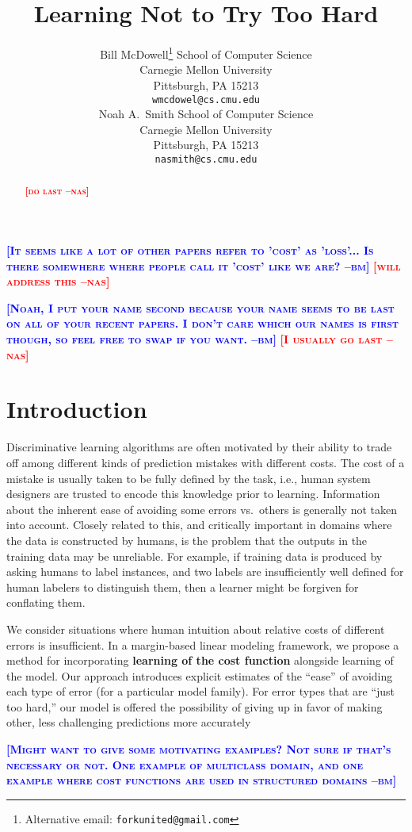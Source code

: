 \documentclass{article} %
\title{Learning Not to Try Too Hard}
\author{
Bill McDowell\thanks{Alternative email: \texttt{forkunited@gmail.com}}
School of Computer Science\\
Carnegie Mellon University\\
Pittsburgh, PA 15213 \\
\texttt{wmcdowel@cs.cmu.edu} \\
\And
Noah A.~Smith
School of Computer Science\\
Carnegie Mellon University\\
Pittsburgh, PA 15213 \\
\texttt{nasmith@cs.cmu.edu} \\
}
\newcommand{\bmcomment}[1]{\textcolor{blue}{\textsc{\textbf{[#1 --bm]}}}}
\newcommand{\nascomment}[1]{\textcolor{red}{\textsc{\textbf{[#1 --nas]}}}}
\begin{document}
\maketitle


\bmcomment{It seems like a lot of other papers refer to 'cost' as 'loss'... 
Is there somewhere where people call it 'cost' like we are?}
\nascomment{will address this}

\bmcomment{Noah, I put your name second because your name seems 
to be last on all of your recent papers.  I don't care which our names is
first though, so feel free to swap if you want.} \nascomment{I usually
go last}

\begin{abstract}
\nascomment{do last}
\end{abstract}

\section{Introduction}

Discriminative learning algorithms are often motivated by their
ability to trade off among different kinds of prediction mistakes with
different costs.  The cost of a mistake is usually taken to be fully
defined by the task, i.e., human system designers are trusted to
encode this knowledge prior to learning.  Information about the
inherent ease of avoiding some errors vs.~others is generally not
taken into account.   Closely related to this, and critically
important in domains where the data is constructed by humans, is the
problem that the outputs in the training data may be unreliable.  For
example, if training data is produced by asking humans to label
instances, and two labels are insufficiently well defined for human
labelers to distinguish them,
then a learner might be forgiven for conflating them.

We consider situations where human intuition about relative costs of
different errors is insufficient.  In a margin-based linear modeling
framework, we propose a method for incorporating \textbf{learning of
  the cost function} alongside learning of the model.  Our approach
introduces explicit estimates of the ``ease'' of avoiding each type of
error
(for a particular model family).   For error types that are ``just too
hard,'' our model is offered the possibility of giving up in favor of
making other, less challenging predictions more accurately



\bmcomment{Might want to give some motivating examples? Not sure if that's
necessary or not. One example of multiclass domain, and one example where
cost functions are used in structured domains} 
\end{document}

